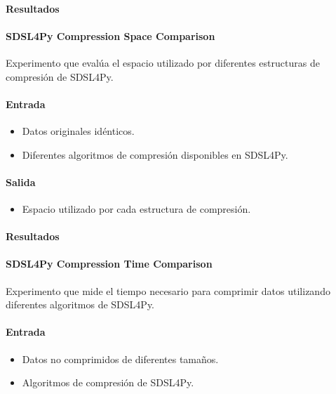 \paragraph{Resultados}
\vspace{0.5em}
\noindent

\SDSLFourPyAccessTimeComparison

\paragraph{SDSL4Py Compression Space Comparison}
\label{sdsl4py_compression_space}

Experimento que evalúa el espacio utilizado por diferentes estructuras de compresión de SDSL4Py.

\paragraph{Entrada}
\begin{itemize}
    \item Datos originales idénticos.
    \item Diferentes algoritmos de compresión disponibles en SDSL4Py.
\end{itemize}

\paragraph{Salida}
\begin{itemize}
    \item Espacio utilizado por cada estructura de compresión.
\end{itemize}

\paragraph{Resultados}
\vspace{0.5em}
\noindent

\SDSLFourPyCompressionSpaceComparison

\paragraph{SDSL4Py Compression Time Comparison}
\label{sdsl4py_compression_time}

Experimento que mide el tiempo necesario para comprimir datos utilizando diferentes algoritmos de SDSL4Py.

\paragraph{Entrada}
\begin{itemize}
    \item Datos no comprimidos de diferentes tamaños.
    \item Algoritmos de compresión de SDSL4Py.
\end{itemize}

